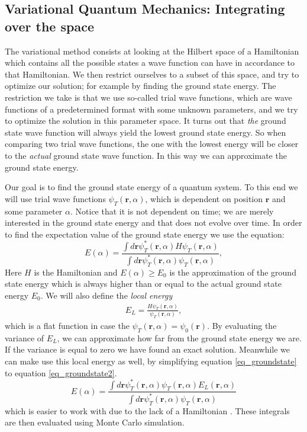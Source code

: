 \subsection{Variational Quantum Mechanics: Integrating over the space}
The variational method consists at looking at the Hilbert space of a Hamiltonian which contains all the possible states
a wave function can have in accordance to that Hamiltonian. We then restrict ourselves to a subset of this space,
and try to optimize our solution; for example by finding the ground state energy. The restriction we take is that
we use so-called trial wave functions, which are wave functions of a predetermined format with some unknown parameters,
and we try to optimize the solution in this parameter space. It turns out that \textit{the} ground state wave function
will always yield the lowest ground state energy. So when comparing two trial wave functions, the one with the lowest
energy will be closer to the \textit{actual} ground state wave function. In this way we can approximate the ground state
energy. \cite{AdvStatMech}


Our goal is to find the ground state energy of a quantum system. To this end we will
use trial wave functions $\psi_T(\textbf{r},\alpha)$, which is dependent on position $\textbf{r}$ and some parameter $\alpha$.
Notice that it is not dependent on time; we are merely interested in the ground state energy and that does not evolve over time.
In order to find the expectation value of the ground state energy we use the equation:
\begin{equation}\label{eq_groundstate}
E(\alpha) = \frac{\int d\textbf{r} \psi_T^*(\textbf{r},\alpha)H\psi_T(\textbf{r},\alpha)}{\int d\textbf{r}
 \psi_T^*(\textbf{r},\alpha)\psi_T(\textbf{r},\alpha)},
\end{equation}
Here $H$ is the Hamiltonian and $E(\alpha) \geq E_0$ is the approximation of the ground state energy which is always higher
than or equal to the actual ground state energy $E_0$.  We will also define the
\textit{local energy}
\begin{align}
E_L = \frac{H\psi_T(\textbf{r},\alpha)}{\psi_T(\textbf{r},\alpha)},
\end{align}
 which is a flat function in case
the $\psi_T(\textbf{r},\alpha) = \psi_0(\textbf{r})$. By evaluating the variance of $E_L$, we can approximate how far from
the ground state energy we are. If the variance is equal to zero we have found an exact solution. Meanwhile we can make use
this local energy as well, by simplifying equation \ref{eq_groundstate} to equation \ref{eq_groundstate2}.
\begin{equation}\label{eq_groundstate2}
E(\alpha) = \frac{\int d\textbf{r} \psi_T^*(\textbf{r},\alpha)\psi_T(\textbf{r},\alpha)E_L(\textbf{r},\alpha)}{\int d\textbf{r} \psi_T^*(\textbf{r},\alpha)\psi_T(\textbf{r},\alpha)}
\end{equation}
which is easier to work with due to the lack of a Hamiltonian \cite{JosBook}. These integrals are then evaluated using
Monte Carlo simulation.


